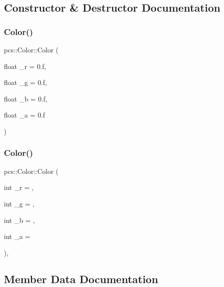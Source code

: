 \subsection{Constructor \& Destructor Documentation}
\mbox{\label{structpcs_1_1Color_a350f229503770fe243369b423251b9f7}} 
\subsubsection{\texorpdfstring{Color()}{Color()}\hspace{0.1cm}{\footnotesize\ttfamily [1/2]}}
{\footnotesize\ttfamily pcs\+::\+Color\+::\+Color (\begin{DoxyParamCaption}\item[{float}]{\+\_\+r = {\ttfamily 0.f},  }\item[{float}]{\+\_\+g = {\ttfamily 0.f},  }\item[{float}]{\+\_\+b = {\ttfamily 0.f},  }\item[{float}]{\+\_\+a = {\ttfamily 0.f} }\end{DoxyParamCaption})\hspace{0.3cm}{\ttfamily [inline]}}

\mbox{\label{structpcs_1_1Color_af88207521ac6d0abcd33e63e809131ea}} 
\subsubsection{\texorpdfstring{Color()}{Color()}\hspace{0.1cm}{\footnotesize\ttfamily [2/2]}}
{\footnotesize\ttfamily pcs\+::\+Color\+::\+Color (\begin{DoxyParamCaption}\item[{int}]{\+\_\+r = {},  }\item[{int}]{\+\_\+g = {},  }\item[{int}]{\+\_\+b = {},  }\item[{int}]{\+\_\+a = {} }\end{DoxyParamCaption})\hspace{0.3cm}{\ttfamily [inline]}, {\ttfamily [explicit]}}



\subsection{Member Data Documentation}
\mbox{\label{structpcs_1_1Color_af14f235977414c3a8c638f70fc808c2e}} 
